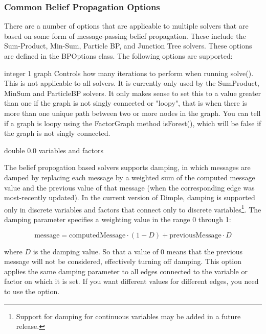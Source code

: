 \clearpage
\subsubsection{Common Belief Propagation Options}
\label{sec:BPOptions}

There are a number of options that are applicable to multiple solvers that are based on some form of message-passing belief propagation. These include the Sum-Product, Min-Sum, Particle BP, and Junction Tree solvers. These options are defined in the BPOptions class. The following options are supported:


{integer}
{1}
{graph}
{Controls how many iterations to perform when running solve(). This is not applicable to all solvers. It is currently only used by the SumProduct, MinSum and ParticleBP solvers. It only makes sense to set this to a value greater than one if the graph is not singly connected or "loopy", that is when there is more than one unique path between two or more nodes in the graph. You can tell if a graph is loopy using the FactorGraph method isForest(), which will be false if the graph is not singly connected.}


{double}
{0.0}
{variables and factors}
{The belief propogation based solvers supports damping, in which messages are damped by replacing each message by a weighted sum of the computed message value and the previous value of that message (when the corresponding edge was most-recently updated). In the current version of Dimple, damping is supported only in discrete variables and factors that connect only to discrete variables\footnote{Support for damping for continuous variables may be added in a future release.}.
\linebreak
\linebreak
The damping parameter specifies a weighting value in the range 0 through 1:

\[
\mathrm{message} = \mathrm{computedMessage} \cdot (1 - D) + \mathrm{previousMessage} \cdot D
\]

where $D$ is the damping value. So that a value of 0 means that the previous message will not be considered, effectively turning off damping.
\linebreak
\linebreak
This option applies the same damping parameter to all edges connected to the variable or factor on which it is set. If you want different values for different edges, you need to use the  option.
}

